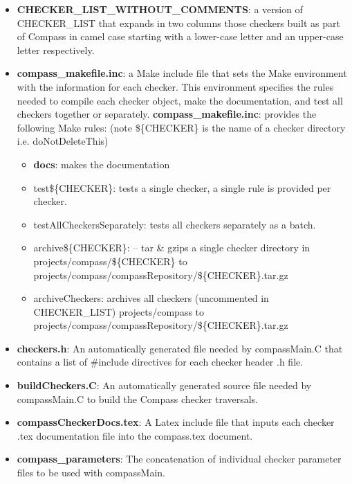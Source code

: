 \begin{itemize}
\item {\bf CHECKER\_LIST\_WITHOUT\_COMMENTS}: a version of CHECKER\_LIST
	that expands in two columns those checkers built as part of Compass
	in camel case starting with a lower-case letter and an upper-case
	letter respectively.
\item {\bf compass\_makefile.inc}: a Make include file that sets the Make environment
	with the information for each checker. This environment specifies
	the rules needed to compile each checker object, make the
	documentation, and test all checkers together or separately.
   {\bf compass\_makefile.inc}: provides the following Make rules: 
	(note \$\{CHECKER\} is the name of a checker directory i.e. 
	doNotDeleteThis)
   \begin{itemize}
      \item {\bf docs}:  makes the documentation

      \item test\$\{CHECKER\}: tests a single checker, a single rule is provided
		      per checker.

      \item testAllCheckersSeparately: tests all checkers separately as a batch.

      \item archive\$\{CHECKER\}: -- tar \& gzips a single checker directory in 
		projects/compass/\$\{CHECKER\} to 
		projects/compass/compassRepository/\$\{CHECKER\}.tar.gz

      \item archiveCheckers: archives all checkers (uncommented in CHECKER\_LIST)
                projects/compass to
                projects/compass/compassRepository/\$\{CHECKER\}.tar.gz
   \end{itemize}

\item {\bf checkers.h}: An automatically generated file needed by compassMain.C that 
	contains a list of \#include directives for each checker header .h file.

\item {\bf buildCheckers.C}: An automatically generated source file needed by 
	compassMain.C to build the Compass checker traversals.

\item {\bf compassCheckerDocs.tex}: A Latex include file that inputs each checker .tex
	documentation file into the compass.tex document.

\item {\bf compass\_parameters}: The concatenation of individual checker parameter files
	to be used with compassMain.

\end{itemize}




